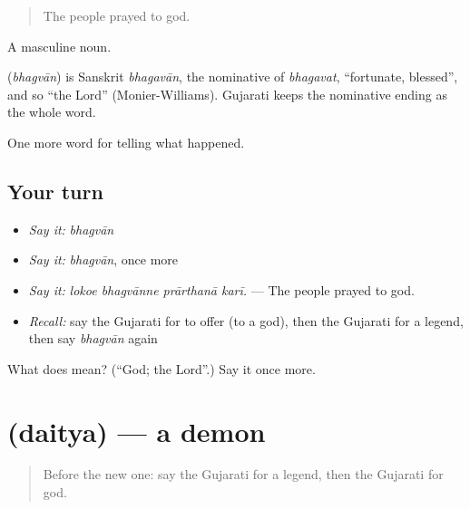 \begin{quote}
The people prayed to god.
\end{quote}

A masculine noun.

\begin{cousinweb}
\textbf{} (\emph{bhagvān}) is Sanskrit \emph{bhagavān}, the nominative of \emph{bhagavat}, \textquotedblleft{}fortunate, blessed\textquotedblright{}, and so \textquotedblleft{}the Lord\textquotedblright{} (Monier-Williams). Gujarati keeps the nominative ending as the whole word.
\end{cousinweb}

\begin{grammarlens}[title={What you've built}]
One more word for telling what happened.
\end{grammarlens}

\subsection*{Your turn}
\begin{itemize}
\raggedright
  \item \emph{Say it:} \emph{bhagvān}
  \item \emph{Say it:} \emph{bhagvān}, once more
  \item \emph{Say it:} \emph{lokoe bhagvānne prārthanā karī.} — The people prayed to god.
  \item \emph{Recall:} say the Gujarati for to offer (to a god), then the Gujarati for a legend, then say \emph{bhagvān} again
\end{itemize}

\begin{tcolorbox}[breakable,colback=teal!4,colframe=teal!35!black,title={Before you move on}]
What does  mean? (\textquotedblleft{}God; the Lord\textquotedblright{}.) Say it once more.
\end{tcolorbox}
\section[\texorpdfstring{\gu{દૈત્ય} (daitya)}{દૈત્ય (daitya)}]{ (daitya) — a demon}

\label{lesson:GU-C332-daitya}



\begin{quote}
Before the new one: say the Gujarati for a legend, then the Gujarati for god.
\end{quote}

